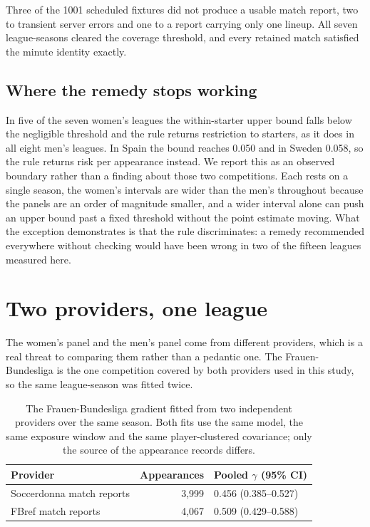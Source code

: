 \documentclass[11pt]{article}
\begin{document}
Three of the 1001 scheduled fixtures did not produce a usable match report, two to transient server errors and one to a report carrying only one lineup. All seven league-seasons cleared the coverage threshold, and every retained match satisfied the minute identity exactly.

\subsection*{Where the remedy stops working}

In five of the seven women's leagues the within-starter upper bound falls below the negligible threshold and the rule returns restriction to starters, as it does in all eight men's leagues. In Spain the bound reaches 0.050 and in Sweden 0.058, so the rule returns risk per appearance instead. We report this as an observed boundary rather than a finding about those two competitions. Each rests on a single season, the women's intervals are wider than the men's throughout because the panels are an order of magnitude smaller, and a wider interval alone can push an upper bound past a fixed threshold without the point estimate moving. What the exception demonstrates is that the rule discriminates: a remedy recommended everywhere without checking would have been wrong in two of the fifteen leagues measured here.

\section{Two providers, one league}

The women's panel and the men's panel come from different providers, which is a real threat to comparing them rather than a pedantic one. The Frauen-Bundesliga is the one competition covered by both providers used in this study, so the same league-season was fitted twice.

\begin{table}[h]
\centering
\caption{The Frauen-Bundesliga gradient fitted from two independent providers over the same season. Both fits use the same model, the same exposure window and the same player-clustered covariance; only the source of the appearance records differs.}
\label{tab:supp_cross_source}
\small
\begin{tabular}{lrl}
\toprule
Provider & Appearances & Pooled $\gamma$ (95\% CI)\\
\midrule
Soccerdonna match reports & 3,999 & 0.456 (0.385--0.527)\\
FBref match reports & 4,067 & 0.509 (0.429--0.588)\\
\bottomrule
\end{tabular}
\end{table}
\end{document}
